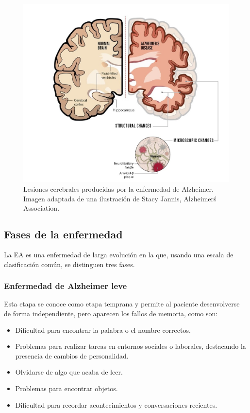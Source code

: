 \begin{figure}[H]
    \centering
    \includegraphics[width=\textwidth]{./imgs/lesiones-cerebrales}
    \caption{Lesiones cerebrales producidas por la enfermedad de Alzheimer.\\Imagen adaptada de una
    ilustración de Stacy Jannis, Alzheimer\'s Association.}
    \label{fig:lesiones-cerebrales}
\end{figure}

\subsection{Fases de la enfermedad}\label{subsec:fases-enfermedad}
La EA es una enfermedad de larga evolución en la que, usando una escala de clasificación común, se distinguen tres fases.

\subsubsection{Enfermedad de Alzheimer leve}\label{subsubsec:etapa-temprana-EA}
Esta etapa se conoce como etapa temprana y permite al paciente desenvolverse de forma independiente, pero aparecen los
fallos de memoria, como son:
\begin{itemize}
    \item Dificultad para encontrar la palabra o el nombre correctos.
    \item Problemas para realizar tareas en entornos sociales o laborales, destacando la presencia de cambios de
    personalidad.
    \item Olvidarse de algo que acaba de leer.
    \item Problemas para encontrar objetos.
    \item Dificultad para recordar acontecimientos y conversaciones recientes.\\
\end{itemize}

